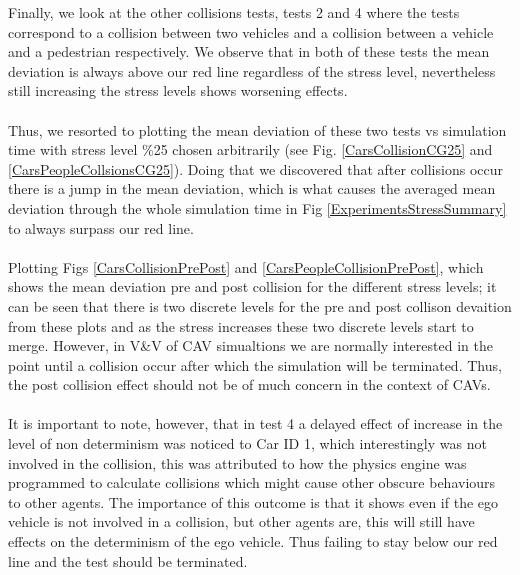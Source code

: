 \noindent Finally, we look at the other collisions tests, tests 2 and 4 where the tests correspond to a collision between two vehicles and a collision between a vehicle and a pedestrian respectively. 
We observe that in both of these tests the mean deviation is always above our red line regardless of the stress level, nevertheless still increasing the stress levels shows worsening effects. \\\\
\noindent Thus, we resorted to plotting the mean deviation of these two tests vs simulation time with stress level \%25 chosen arbitrarily (see Fig. \ref{CarsCollisionCG25} and \ref{CarsPeopleCollsionsCG25}). 
Doing that we discovered that after collisions occur there is a jump in the mean deviation, which is what causes the averaged mean deviation through the whole simulation time in Fig \ref{ExperimentsStressSummary} to always surpass our red line.\\\\
\noindent Plotting Figs \ref{CarsCollisionPrePost} and \ref{CarsPeopleCollisionPrePost}, which shows the mean deviation pre and post collision for the different stress levels; it can be seen that there is two discrete levels for the pre and post collison devaition from these plots and as the stress increases these two discrete levels start to merge. 
However, in V\&V of CAV simualtions we  are normally interested in the point until a collision occur after which the simulation will be terminated. Thus, the post collision effect should not be of much concern in the context of CAVs.\\\\
\noindent It is important to note, however, that in test 4 a delayed effect of increase in the level of non determinism was noticed to Car ID 1, which interestingly was not involved in the collision, this was attributed to how the physics engine was programmed to calculate collisions which might cause other obscure behaviours to other agents. The importance of this outcome is that it shows even if the ego vehicle is not involved in a collision, but other agents are, this will still have effects on the determinism of the ego vehicle. Thus failing to stay below our red line and the test should be terminated.


